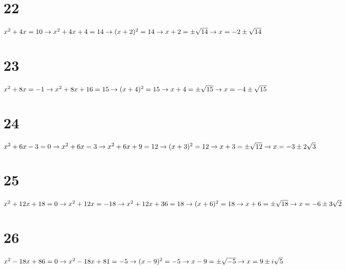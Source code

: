 \documentclass{article}
\theoremstyle{definition}
\begin{document}
\section*{22}
$x^2+4x=10\newline\rightarrow x^2+4x+4=14\newline\rightarrow (x+2)^2=14\newline\rightarrow x+2=\pm\sqrt{14}\newline\rightarrow x=-2\pm\sqrt{14}$

\section*{23}
$x^2+8x=-1\newline\rightarrow x^2+8x+16=15\newline\rightarrow (x+4)^2=15\newline\rightarrow x+4=\pm\sqrt{15}\newline\rightarrow x=-4\pm\sqrt{15}$

\section*{24}
$x^2+6x-3=0\newline\rightarrow x^2+6x=3\newline\rightarrow x^2+6x+9=12\newline\rightarrow (x+3)^2=12\newline\rightarrow x+3=\pm\sqrt{12}\newline\rightarrow 
x=-3\pm 2\sqrt{3}$

\section*{25}
$x^2+12x+18=0\newline\rightarrow x^2+12x=-18\newline\rightarrow x^2+12x+36=18\newline\rightarrow (x+6)^2=18\newline\rightarrow x+6=\pm\sqrt{18}\newline
\rightarrow x=-6\pm 3\sqrt{2}$

\section*{26}
$x^2-18x+86=0\newline\rightarrow x^2-18x+81=-5\newline\rightarrow (x-9)^2=-5\newline\rightarrow x-9=\pm\sqrt{-5}\newline\rightarrow x=9\pm i\sqrt{5}$
\end{document}
